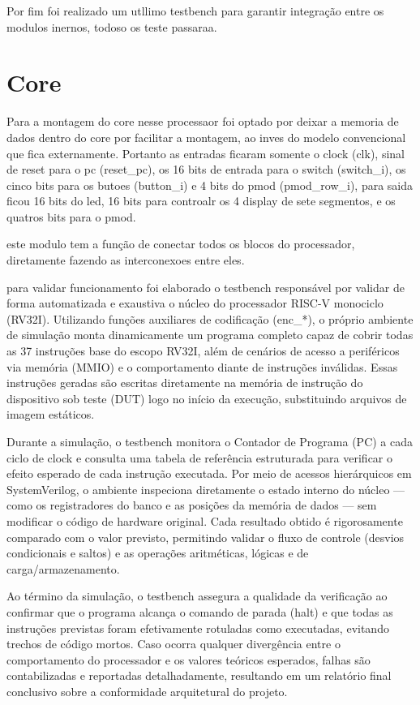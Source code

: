 Por fim foi realizado um utllimo testbench para garantir integração entre os modulos inernos, todoso os teste passaraa. 



\section{Core}
\label{sec:core}


Para a montagem do core nesse processaor foi optado por deixar a memoria de dados dentro do core por facilitar a montagem, ao inves do modelo convencional que fica externamente. Portanto as entradas ficaram somente o clock (clk), sinal de reset para o pc (reset_pc), os 16 bits de entrada para o switch (switch_i), os  cinco bits para os butoes (button_i) e 4 bits do pmod (pmod_row_i), para saida ficou 16 bits do led, 16 bits para controalr os 4 display de sete segmentos, e os quatros bits para o pmod.

este modulo tem a função de conectar todos os blocos do processador, diretamente fazendo as interconexoes entre eles.

para validar funcionamento foi elaborado o testbench responsável por validar de forma automatizada e exaustiva o núcleo do processador RISC-V monociclo (RV32I). Utilizando funções auxiliares de codificação (enc_*), o próprio ambiente de simulação monta dinamicamente um programa completo capaz de cobrir todas as 37 instruções base do escopo RV32I, além de cenários de acesso a periféricos via memória (MMIO) e o comportamento diante de instruções inválidas. Essas instruções geradas são escritas diretamente na memória de instrução do dispositivo sob teste (DUT) logo no início da execução, substituindo arquivos de imagem estáticos.

Durante a simulação, o testbench monitora o Contador de Programa (PC) a cada ciclo de clock e consulta uma tabela de referência estruturada para verificar o efeito esperado de cada instrução executada. Por meio de acessos hierárquicos em SystemVerilog, o ambiente inspeciona diretamente o estado interno do núcleo — como os registradores do banco e as posições da memória de dados — sem modificar o código de hardware original. Cada resultado obtido é rigorosamente comparado com o valor previsto, permitindo validar o fluxo de controle (desvios condicionais e saltos) e as operações aritméticas, lógicas e de carga/armazenamento.

Ao término da simulação, o testbench assegura a qualidade da verificação ao confirmar que o programa alcança o comando de parada (halt) e que todas as instruções previstas foram efetivamente rotuladas como executadas, evitando trechos de código mortos. Caso ocorra qualquer divergência entre o comportamento do processador e os valores teóricos esperados, falhas são contabilizadas e reportadas detalhadamente, resultando em um relatório final conclusivo sobre a conformidade arquitetural do projeto.

